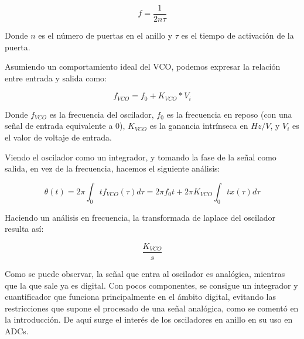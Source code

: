 \documentclass[12pt]{report} %
\begin{document}
	\begin{figure}[h]
		\begin{equation}
		\label{vco-freq-sw-t}
		f = \frac{1}{2 n \tau}
		\end{equation}
		\footnotemark
	\end{figure}
	
	Donde $n$ es el número de puertas en el anillo y $\tau$ es el tiempo de activación de la puerta.
	
	Asumiendo un comportamiento ideal del VCO, podemos expresar la relación entre entrada y salida como:
	\begin{figure}[h]
		\begin{equation}
		\label{vco-freq-ideal}
		f_{VCO}= f_{0} + K_{VCO} * V_{i}
		\end{equation}
		\footnotemark
	\end{figure}
	
	Donde $f_{VCO}$ es la frecuencia del oscilador, $f_{0}$ es la frecuencia en reposo (con una señal de entrada equivalente a 0), $K_{VCO}$ es la ganancia intrínseca en $Hz/V$, y $V_{i}$ es el valor de voltaje de entrada.
	
	Viendo el oscilador como un integrador, y tomando la fase de la señal como salida, en vez de la frecuencia, hacemos el siguiente análisis:
	
	\begin{figure}[h]
		\begin{equation}
		\label{vco-phase}
		\theta(t) = 2\pi\int_{0}{t}f_{VCO}(\tau)d\tau = 2\pi f_{0}t + 2\pi K_{VCO}\int_{0}{t}x(\tau)d\tau
		\end{equation}
		\footnotemark
	\end{figure}
	
	Haciendo un análisis en frecuencia, la transformada de laplace del oscilador resulta así:
	
	\begin{figure}[h]
		\begin{equation}
		\label{vco-laplace}
		\frac{K_{VCO}}{s}
		\end{equation}
		\footnotemark
	\end{figure}
	

	Como se puede observar, la señal que entra al oscilador es analógica, mientras que la que sale ya es digital. Con pocos componentes, se consigue un integrador y cuantificador que funciona principalmente en el ámbito digital, evitando las restricciones que supone el procesado de una señal analógica, como se comentó en la introducción. De aquí surge el interés de los osciladores en anillo en su uso en ADCs.
	
\end{document}

